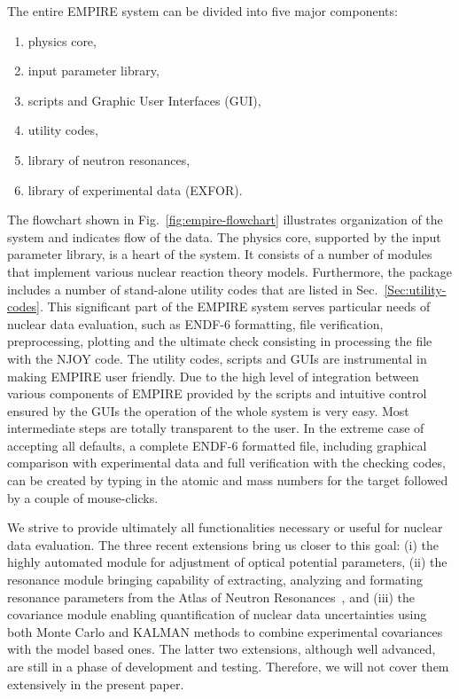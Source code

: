 \documentclass[twocolumn,amsmath,amssymb,10pt,groupedaddress,a4paper]{revtex4}
\begin{document}
The entire EMPIRE system can be divided into five major components:
\begin{enumerate}
\item physics core,
\item input parameter library,
\item scripts and Graphic User Interfaces (GUI),
\item utility codes,
\item library of neutron resonances,
\item library of experimental data (EXFOR).
\end{enumerate}
The flowchart shown in Fig.~\ref{fig:empire-flowchart} illustrates organization of the system and indicates flow of the data. The physics core, supported by the input parameter library, is a heart of the system. It consists of a number of modules that implement various nuclear reaction theory models. Furthermore, the package includes a number of stand-alone utility codes that are listed in Sec.~\ref{Sec:utility-codes}. This significant part of the EMPIRE system serves particular needs of nuclear data evaluation, such as ENDF-6 formatting, file verification, preprocessing, plotting and the ultimate check consisting in processing the file with the NJOY code. The utility codes, scripts and GUIs are instrumental in making EMPIRE user friendly. Due to the high level of integration between various components of EMPIRE provided by the scripts and intuitive control ensured by the GUIs the operation of the whole system is very easy.  Most intermediate steps are totally transparent to the user.  In the extreme case of accepting all defaults, a complete ENDF-6 formatted file, including graphical comparison with experimental data and full verification with the checking codes, can be created by typing in the atomic and mass numbers for the target followed by a couple of mouse-clicks.


We strive to provide ultimately all functionalities necessary or useful for nuclear data evaluation. The three recent extensions bring us closer to this goal: (i) the highly automated module for adjustment of optical potential parameters, (ii) the resonance module bringing capability of extracting, analyzing and formating resonance parameters from the Atlas of Neutron Resonances~\cite{Mughabghab:06}, and (iii) the covariance module enabling quantification of nuclear data uncertainties using both Monte Carlo and KALMAN methods to combine experimental covariances with the model based ones. The latter two extensions, although well advanced, are still in a phase of development and testing. Therefore, we will not cover them extensively in the present paper.
\end{document}
